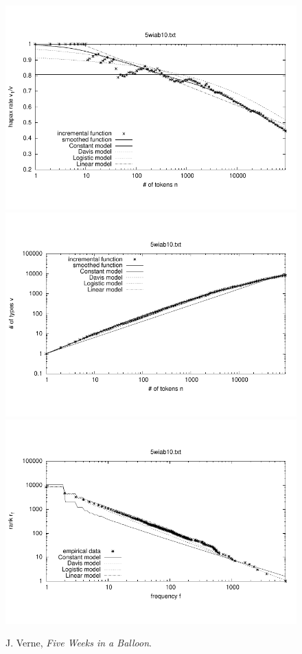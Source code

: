 \documentclass[a4paper,12pt]{article}
\begin{document}

\begin{figure}[p]
  \centering
  \vspace{-2em}
  \includegraphics[width=0.8\columnwidth]{output/herdan/5wiab10_27/token_ratio.pdf}
  \\[-3em]
  \includegraphics[width=0.8\columnwidth]{output/herdan/5wiab10_27/token_type.pdf}
  \\[-3em]
  \includegraphics[width=0.8\columnwidth]{output/herdan/5wiab10_27/frequency_rank.pdf}
  \vspace{-2em}
  \caption{J. Verne, \emph{Five Weeks in a Balloon}.\label{fig5wiab10F}}
\end{figure}
\end{document}
